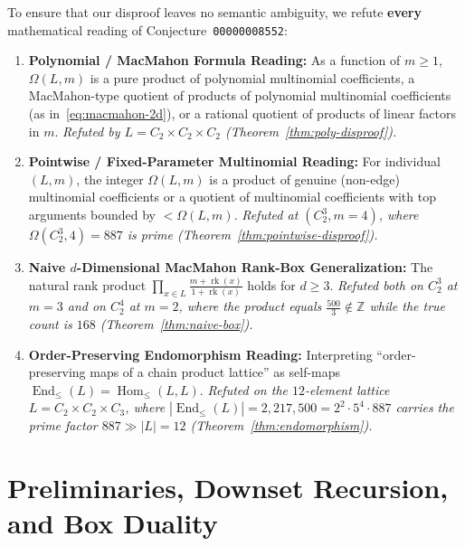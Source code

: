 \documentclass[11pt,a4paper]{article}
\theoremstyle{definition}
\newcommand{\Homle}{\operatorname{Hom}_{\le}}
\newcommand{\Endle}{\operatorname{End}_{\le}}
\newcommand{\rk}{\operatorname{rk}}
\begin{document}
To ensure that our disproof leaves no semantic ambiguity, we refute \textbf{every} mathematical
reading of Conjecture~\texttt{00000008552}:
\begin{enumerate}
  \item[(I)] \textbf{Polynomial / MacMahon Formula Reading:} As a function of $m \ge 1$, $\Omega(L, m)$
        is a pure product of polynomial multinomial coefficients, a MacMahon-type quotient of
        products of polynomial multinomial coefficients (as in~\eqref{eq:macmahon-2d}), or a
        rational quotient of products of linear factors in $m$. \emph{Refuted by
        $L = C_2 \times C_2 \times C_2$ (Theorem~\ref{thm:poly-disproof}).}
  \item[(II)] \textbf{Pointwise / Fixed-Parameter Multinomial Reading:} For individual $(L, m)$, the
        integer $\Omega(L, m)$ is a product of genuine (non-edge) multinomial coefficients or a
        quotient of multinomial coefficients with top arguments bounded by $< \Omega(L, m)$.
        \emph{Refuted at $(C_2^3, m=4)$, where $\Omega(C_2^3, 4) = 887$ is prime
        (Theorem~\ref{thm:pointwise-disproof}).}
  \item[(III)] \textbf{Naive $d$-Dimensional MacMahon Rank-Box Generalization:} The natural rank product
        $\prod_{x \in L} \frac{m + \rk(x)}{1 + \rk(x)}$ holds for $d \ge 3$. \emph{Refuted both on
        $C_2^3$ at $m = 3$ and on $C_2^4$ at $m = 2$, where the product equals $\frac{500}{3} \notin
        \mathbb{Z}$ while the true count is $168$ (Theorem~\ref{thm:naive-box}).}
  \item[(IV)] \textbf{Order-Preserving Endomorphism Reading:} Interpreting ``order-preserving maps of a
        chain product lattice'' as self-maps $\Endle(L) = \Homle(L, L)$. \emph{Refuted on the
        $12$-element lattice $L = C_2 \times C_2 \times C_3$, where $|\Endle(L)| = 2{,}217{,}500 =
        2^2 \cdot 5^4 \cdot 887$ carries the prime factor $887 \gg |L| = 12$
        (Theorem~\ref{thm:endomorphism}).}
\end{enumerate}

\section{Preliminaries, Downset Recursion, and Box Duality}
\end{document}
